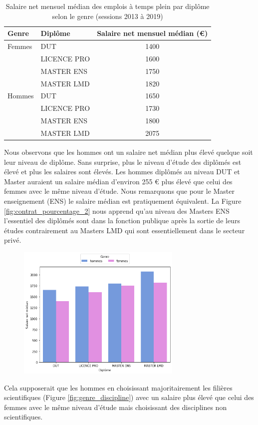 \documentclass[12pt, a4paper, titlepage, table]{article}
\begin{document}
	\begin{table}[H]
		\centering
		\begin{tabular}{llc}
			\toprule
			\textbf{Genre} & \textbf{Diplôme} & \textbf{Salaire net mensuel médian (€)} \\
			\midrule
			Femmes & DUT & 1400 \\
			& LICENCE PRO & 1600 \\
			& MASTER ENS & 1750 \\
			& MASTER LMD & 1820 \\
			\midrule
			Hommes & DUT & 1650 \\
			& LICENCE PRO & 1730 \\
			& MASTER ENS & 1800 \\
			& MASTER LMD & 2075 \\
			\bottomrule
		\end{tabular}
		\caption{Salaire net mensuel médian des emplois à temps plein par diplôme selon le genre (sessions 2013 à 2019)}
		\label{tab:salaire_median_genre}
	\end{table}
	
	
	
	Nous observons que les hommes ont un salaire net médian plus élevé quelque soit leur niveau de diplôme.
	Sans surprise, plus le niveau d'étude des diplômés est élevé et plus les salaires sont élevés.
	Les hommes diplômés au niveau DUT et Master auraient un salaire médian d'environ 255 € plus élevé que celui des femmes avec le même niveau d'étude.
	Nous remarquons que pour le Master enseignement (ENS) le salaire médian est pratiquement équivalent.  
	La Figure \ref{fig:contrat_pourcentage_2} nous apprend qu'au niveau des Masters ENS l'essentiel des diplômés sont dans la fonction publique après la sortie de leurs études contrairement au Masters LMD qui sont essentiellement dans le secteur privé.
		
	\begin{figure}[H]
		\centering
		\includegraphics[width=0.7\textwidth]{../graphs/salaires_medians_genre.png}
		\label{fig:salaire_median_genre}
	\end{figure}
	Cela supposerait que les hommes en choisissant majoritairement les filières scientifiques (Figure \ref{fig:genre_discipline}) avec un salaire plus élevé que celui des femmes avec le même niveau d'étude mais choisissant des disciplines non scientifiques.
	
\end{document}
